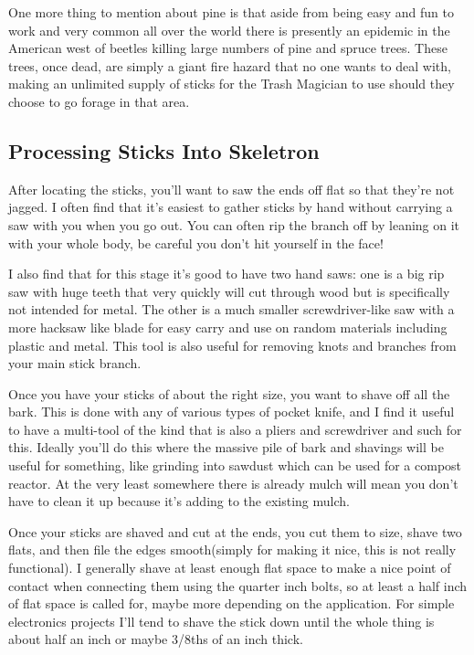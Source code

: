 One more thing to mention about pine is that aside from being easy and
fun to work and very common all over the world there is presently an
epidemic in the American west of beetles killing large numbers of pine
and spruce trees. These trees, once dead, are simply a giant fire hazard
that no one wants to deal with, making an unlimited supply of sticks for
the Trash Magician to use should they choose to go forage in that area.

\subsection{Processing Sticks Into
Skeletron}\label{processing-sticks-into-skeletron}

After locating the sticks, you'll want to saw the ends off flat so that
they're not jagged. I often find that it's easiest to gather sticks by
hand without carrying a saw with you when you go out. You can often rip
the branch off by leaning on it with your whole body, be careful you
don't hit yourself in the face!

I also find that for this stage it's good to have two hand saws: one is
a big rip saw with huge teeth that very quickly will cut through wood
but is specifically not intended for metal. The other is a much smaller
screwdriver-like saw with a more hacksaw like blade for easy carry and
use on random materials including plastic and metal. This tool is also
useful for removing knots and branches from your main stick branch.

Once you have your sticks of about the right size, you want to shave off
all the bark. This is done with any of various types of pocket knife,
and I find it useful to have a multi-tool of the kind that is also a
pliers and screwdriver and such for this. Ideally you'll do this where
the massive pile of bark and shavings will be useful for something, like
grinding into sawdust which can be used for a compost reactor. At the
very least somewhere there is already mulch will mean you don't have to
clean it up because it's adding to the existing mulch.

Once your sticks are shaved and cut at the ends, you cut them to size,
shave two flats, and then file the edges smooth(simply for making it
nice, this is not really functional). I generally shave at least enough
flat space to make a nice point of contact when connecting them using
the quarter inch bolts, so at least a half inch of flat space is called
for, maybe more depending on the application. For simple electronics
projects I'll tend to shave the stick down until the whole thing is
about half an inch or maybe 3/8ths of an inch thick.

